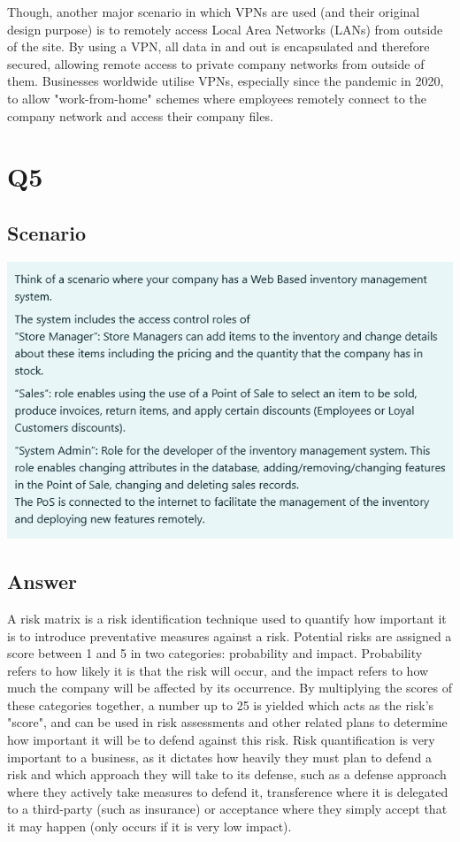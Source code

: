 \documentclass[12pt]{report}
\begin{document}
Though, another major scenario in which VPNs are used (and their original design purpose) is to remotely access Local Area Networks (LANs) from outside of the site. By using a VPN, all data in and out is encapsulated and therefore secured, allowing remote access to private company networks from outside of them. Businesses worldwide utilise VPNs, especially since the pandemic in 2020, to allow "work-from-home" schemes where employees remotely connect to the company network and access their company files.

 \section{Q5}
 \subsection{Scenario}
 \includegraphics[width=.95\linewidth]{scenario.png}
 \subsection{Answer}
 A risk matrix is a risk identification technique used to quantify how important it is to introduce preventative measures against a risk. Potential risks are assigned a score between 1 and 5 in two categories: probability and impact. Probability refers to how likely it is that the risk will occur, and the impact refers to how much the company will be affected by its occurrence. By multiplying the scores of these categories together, a number up to 25 is yielded which acts as the risk's "score", and can be used in risk assessments and other related plans to determine how important it will be to defend against this risk. Risk quantification is very important to a business, as it dictates how heavily they must plan to defend a risk and which approach they will take to its defense, such as a defense approach where they actively take measures to defend it, transference where it is delegated to a third-party (such as insurance) or acceptance where they simply accept that it may happen (only occurs if it is very low impact).
\end{document}
